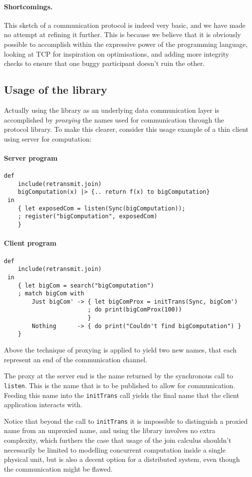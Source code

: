 \paragraph{Shortcomings.} This sketch of a communication protocol is indeed very
basic, and we have made no attempt at refining it further.  This is because we
believe that it is obviously possible to accomplish within the expressive power
of the programming language, looking at TCP for inspiration on optimisations,
and adding more integrity checks to ensure that one buggy participant doesn't
ruin the other.

\subsection{Usage of the library}

Actually using the library as an underlying data communication layer is
accomplished by \emph{proxying} the names used for communication through the
protocol library.  To make this clearer, consider this usage example of a thin
client using server for computation:

\paragraph{Server program}

\begin{verbatim}
def
    include(retransmit.join)
    bigComputation(x) |> {.. return f(x) to bigComputation}
 in
    { let exposedCom = listen(Sync(bigComputation));
    ; register("bigComputation", exposedCom)
    }
\end{verbatim}

\paragraph{Client program}

\begin{verbatim}
def
    include(retransmit.join)
 in
    { let bigCom = search("bigComputation")
    ; match bigCom with
        Just bigCom' -> { let bigComProx = initTrans(Sync, bigCom')
                        ; do print(bigComProx(100))
                        }
        Nothing      -> { do print("Couldn't find bigComputation") }
    }
\end{verbatim}

Above the technique of proxying is applied to yield two new names,
that each represent an end of the communication channel.

The proxy at the server end is the name returned by the synchronous call to
\texttt{listen}. This is the name that is to be published to allow for
communication. Feeding this name into the \texttt{initTrans} call yields the
final name that the client application interacts with.

Notice that beyond the call to \texttt{initTrans} it is impossible to
distinguish a proxied name from an unproxied name, and using the library
involves no extra complexity, which furthers the case that usage of the join
calculus shouldn't necessarily be limited to modelling concurrent computation
inside a single physical unit, but is also a decent option for a distributed
system, even though the communication might be flawed.


